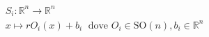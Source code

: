 \documentclass[preview]{standalone}
\begin{document}
\begin{align*}
S_i : \mathbb{R}^n \to \mathbb{R}^n \\ x \mapsto r O_i(x) + b_i \; \text{ dove } O_i \in \text{SO}(n), b_i \in \mathbb{R}^n \\
\end{align*}
\end{document}
